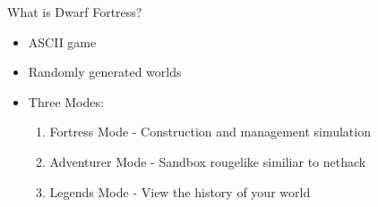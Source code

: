 \begin{frame}{What is Dwarf Fortress?}

\begin{itemize}
\item ASCII game
\item Randomly generated worlds
\item Three Modes:
\begin{enumerate}
	\item Fortress Mode - Construction and management simulation
	\item Adventurer Mode - Sandbox rougelike similiar to nethack
	\item Legends Mode - View the history of your world
\end{enumerate}
\end{itemize}
\end{frame}

